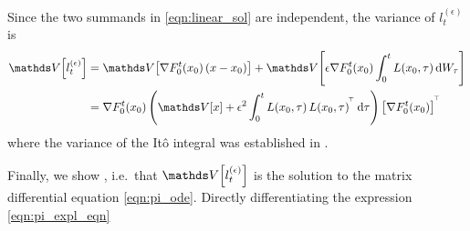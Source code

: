 Since the two summands in \cref{eqn:linear_sol} are independent, the variance of \(l_t^{(\epsilon)}\) is
\begin{align*}
	\var{l_t^{(\epsilon)}} & = \var{\nabla F_0^t\!\left(x_0\right) \left(x - x_0\right)} + \var{\epsilon \nabla F_0^t\!\left(x_0\right)\int_0^t{L\!\left(x_0,\tau\right)\dif W_\tau}}                                      \\
	                       & = \nabla F_0^t\!\left(x_0\right) \left(\var{x} + \epsilon^2\int_0^t{L\!\left(x_0, \tau\right)L\!\left(x_0, \tau\right)^{\T} \dif\tau}\right) \left[\nabla F_0^t\!\left(x_0\right)\right]^{\T}
\end{align*}
where the variance of the It\^o integral was established in .

Finally, we show , i.e.\ that \(\var{l_t^{(\epsilon)}}\) is the solution to the matrix differential equation \cref{eqn:pi_ode}.
Directly differentiating the expression \cref{eqn:pi_expl_eqn}
